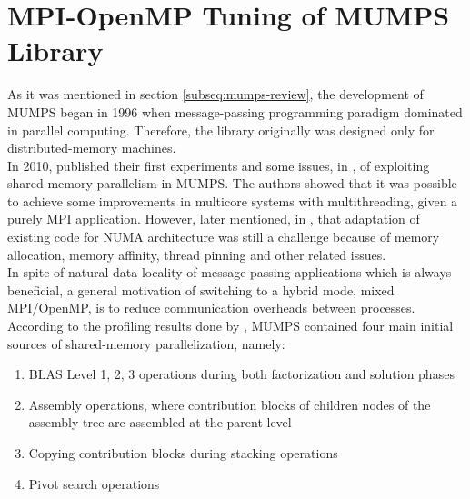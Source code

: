 \section{MPI-OpenMP Tuning of MUMPS Library}
\label{subseq:mpi-openmp}


As it was mentioned in  section \ref{subseq:mumps-review}, the development of MUMPS began in 1996 when message-passing programming paradigm dominated in parallel computing. Therefore, the library originally was designed only for distributed-memory machines.\\

In 2010,  \citeauthor{chowdhury2010some} published their first experiments and some issues, in \cite{chowdhury2010some}, of exploiting shared memory parallelism in MUMPS. The authors showed that it was possible to achieve some improvements in multicore systems with multithreading, given a purely MPI application. However, later \citeauthor{l2013introduction} mentioned, in \cite{l2013introduction}, that adaptation of existing code for NUMA architecture was still a challenge because of memory allocation, memory affinity, thread pinning and other related issues.\\


In spite of natural data locality of message-passing applications which is always beneficial, a general motivation of switching to a hybrid mode, mixed MPI/OpenMP, is to reduce communication overheads between processes. According to the profiling results done by \citeauthor{chowdhury2010some}, MUMPS contained four main initial sources of shared-memory parallelization, namely: 

\begin{enumerate}

	\item BLAS Level 1, 2, 3 operations during both factorization and solution phases \label{openmp-blocks-1}
	
	\item Assembly operations, where contribution blocks of children nodes of the assembly tree are assembled at the parent level \label{openmp-blocks-2}
	
	\item Copying contribution blocks during stacking operations \label{openmp-blocks-3}
	
	\item Pivot search operations \label{openmp-blocks-4}

\end{enumerate}


